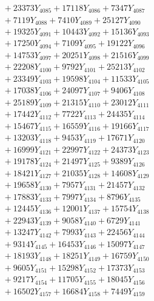 \documentclass[a4paper,10pt]{article}
\begin{document}
{\begin{align}
&\;  + 23373 Y_{4085} + 17118 Y_{4086} + 7347 Y_{4087} \\[0.3ex]
&\;  + 7119 Y_{4088} + 7410 Y_{4089} + 25127 Y_{4090} \\[0.3ex]
&\;  + 19325 Y_{4091} + 10443 Y_{4092} + 15136 Y_{4093} \\[0.3ex]
&\;  + 17250 Y_{4094} + 7109 Y_{4095} + 19122 Y_{4096} \\[0.3ex]
&\;  + 14753 Y_{4097} + 20251 Y_{4098} + 21516 Y_{4099} \\[0.3ex]
&\;  + 22208 Y_{4100} + 9792 Y_{4101} + 25213 Y_{4102} \\[0.3ex]
&\;  + 23349 Y_{4103} + 19598 Y_{4104} + 11533 Y_{4105} \\[0.3ex]
&\;  + 17038 Y_{4106} + 24097 Y_{4107} + 9406 Y_{4108} \\[0.5ex]\allowbreak
&\;  + 25189 Y_{4109} + 21315 Y_{4110} + 23012 Y_{4111} \\[0.3ex]
&\;  + 17442 Y_{4112} + 7722 Y_{4113} + 24435 Y_{4114} \\[0.3ex]
&\;  + 15467 Y_{4115} + 16559 Y_{4116} + 19166 Y_{4117} \\[0.3ex]
&\;  + 13203 Y_{4118} + 9453 Y_{4119} + 17671 Y_{4120} \\[0.3ex]
&\;  + 16999 Y_{4121} + 22997 Y_{4122} + 24373 Y_{4123} \\[0.3ex]
&\;  + 19178 Y_{4124} + 21497 Y_{4125} + 9389 Y_{4126} \\[0.3ex]
&\;  + 18421 Y_{4127} + 21035 Y_{4128} + 14608 Y_{4129} \\[0.3ex]
&\;  + 19658 Y_{4130} + 7957 Y_{4131} + 21457 Y_{4132} \\[0.3ex]
&\;  + 17883 Y_{4133} + 7997 Y_{4134} + 8796 Y_{4135} \\[0.3ex]
&\;  + 12445 Y_{4136} + 12001 Y_{4137} + 15754 Y_{4138} \\[0.5ex]\allowbreak
&\;  + 22943 Y_{4139} + 9058 Y_{4140} + 6729 Y_{4141} \\[0.3ex]
&\;  + 13247 Y_{4142} + 7993 Y_{4143} + 22456 Y_{4144} \\[0.3ex]
&\;  + 9314 Y_{4145} + 16453 Y_{4146} + 15097 Y_{4147} \\[0.3ex]
&\;  + 18193 Y_{4148} + 18251 Y_{4149} + 16759 Y_{4150} \\[0.3ex]
&\;  + 9605 Y_{4151} + 15298 Y_{4152} + 17373 Y_{4153} \\[0.3ex]
&\;  + 9217 Y_{4154} + 11705 Y_{4155} + 18045 Y_{4156} \\[0.3ex]
&\;  + 16502 Y_{4157} + 16684 Y_{4158} + 7449 Y_{4159} \\[0.3ex]

\end{align}}
\end{document}
